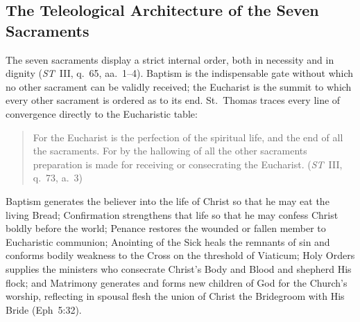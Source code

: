 \subsection{The Teleological Architecture of the Seven Sacraments}
\label{subsec:teleological-architecture}

The seven sacraments display a strict internal order, both in necessity and in dignity (\emph{ST}~III, q.~65, aa.~1--4). Baptism is the indispensable gate without which no other sacrament can be validly received; the Eucharist is the summit to which every other sacrament is ordered as to its end. St.~Thomas traces every line of convergence directly to the Eucharistic table:
\begin{quotation}
For the Eucharist is the perfection of the spiritual life, and the end of all the sacraments. For by the hallowing of all the other sacraments preparation is made for receiving or consecrating the Eucharist. (\emph{ST}~III, q.~73, a.~3)
\end{quotation}
Baptism generates the believer into the life of Christ so that he may eat the living Bread; Confirmation strengthens that life so that he may confess Christ boldly before the world; Penance restores the wounded or fallen member to Eucharistic communion; Anointing of the Sick heals the remnants of sin and conforms bodily weakness to the Cross on the threshold of Viaticum; Holy Orders supplies the ministers who consecrate Christ's Body and Blood and shepherd His flock; and Matrimony generates and forms new children of God for the Church's worship, reflecting in spousal flesh the union of Christ the Bridegroom with His Bride (Eph~5:32).

